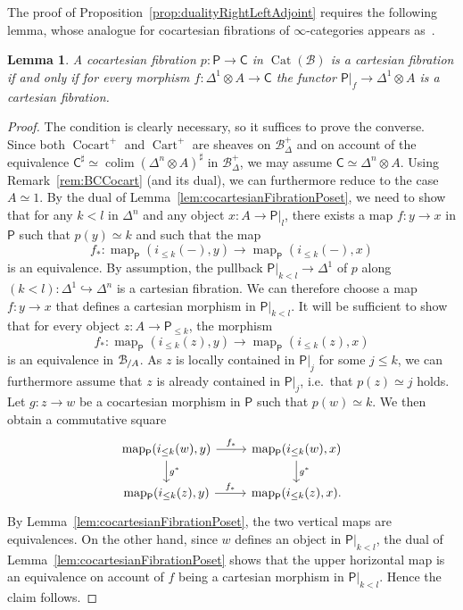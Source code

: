 \documentclass[reqno]{amsart}
\numberwithin{equation}{subsection}
\theoremstyle{plain}
\newtheorem{lemma}[equation]{Lemma}
\theoremstyle{definition}
\let\scr=\mathcal
\let\into=\hookrightarrow
\def\BB{\scr B}
\DeclareMathOperator{\Cat}{Cat}
\DeclareMathOperator{\Cart}{Cart}
\DeclareMathOperator{\Cocart}{Cocart}
\DeclareMathOperator{\Map}{map}
\newcommand{\map}[1]{\Map_{#1}}
\newcommand{\Over}[2]{#1_{\hspace{-1pt}/#2}}
\newcommand{\I}[1]{\mathsf{#1}}
\newcommand{\mSimp}[1]{#1_{\Delta}^+}
\DeclareMathOperator*{\colim}{colim}
\begin{document}
The proof of Proposition~\ref{prop:dualityRightLeftAdjoint} requires the following lemma, whose analogue for cocartesian fibrations of $\infty$-categories appears as~\cite[\href{https://kerodon.net/tag/02FP}{Proposition~02FP}]{kerodon}.
\begin{lemma}
	\label{lem:cartesianCocartesianFibrationCriterion}
	A cocartesian fibration $p\colon\I{P}\to\I{C}$ in $\Cat(\BB)$ is a cartesian fibration if and only if for every morphism $f\colon\Delta^1\otimes A\to \I{C}$ the functor $\I{P}\vert_f\to\Delta^1\otimes A$ is a cartesian fibration.
\end{lemma}
\begin{proof}
	The condition is clearly necessary, so it suffices to prove the converse. Since both $\Cocart^+$ and $\Cart^+$ are sheaves on $\mSimp\BB$ and on account of the equivalence $\I{C}^\sharp\simeq\colim (\Delta^n\otimes A)^\sharp$ in $\mSimp\BB$, we may assume $\I{C}\simeq\Delta^n\otimes A$. Using Remark~\ref{rem:BCCocart} (and its dual), we can furthermore reduce to the case $A\simeq 1$. By the dual of Lemma~\ref{lem:cocartesianFibrationPoset}, we need to show that for any $k<l$ in $\Delta^n$ and any object $x\colon A\to\I{P}\vert_l$, there exists a map $f\colon y\to x$ in $\I{P}$ such that $p(y)\simeq k$ and such that the map
	\begin{equation*}
	f_\ast\colon \map{\I{P}}(i_{\leq k}(-),y)\to\map{\I{P}}(i_{\leq k}(-),x)
	\end{equation*}
	is an equivalence. By assumption, the pullback $\I{P}\vert_{k< l}\to\Delta^1$ of $p$ along $(k< l)\colon\Delta^1\into\Delta^n$ is a cartesian fibration. We can therefore choose a map $f\colon y\to x$ that defines a cartesian morphism in $\I{P}\vert_{k<l}$. It will be sufficient to show that for every object $z\colon A\to \I{P}_{\leq k}$, the morphism
	\begin{equation*}
	f_\ast\colon \map{\I{P}}(i_{\leq k}(z),y)\to\map{\I{P}}(i_{\leq k}(z),x)
	\end{equation*}
	is an equivalence in $\Over{\BB}{A}$. As $z$ is locally contained in $\I{P}\vert_j$ for some $j\leq k$, we can furthermore assume that $z$ is already contained in $\I{P}\vert_j$, i.e.\ that $p(z)\simeq j$ holds. Let $g\colon z\to w$ be a cocartesian morphism in $\I{P}$ such that $p(w)\simeq k$. We then obtain a commutative square
	\begin{equation*}
	\begin{tikzcd}
		\map{\I{P}}(i_{\leq k}(w),y)\arrow[r, "f_\ast"]\arrow[d, "g^\ast"] & \map{\I{P}}(i_{\leq k}(w),x)\arrow[d, "g^\ast"]\\
		\map{\I{P}}(i_{\leq k}(z),y)\arrow[r, "f_\ast"] & \map{\I{P}}(i_{\leq k}(z),x).
	\end{tikzcd}
	\end{equation*}
	By Lemma~\ref{lem:cocartesianFibrationPoset}, the two vertical maps are equivalences. On the other hand, since $w$ defines an object in $\I{P}\vert_{k<l}$, the dual of Lemma~\ref{lem:cocartesianFibrationPoset} shows that the upper horizontal map is an equivalence on account of $f$ being a cartesian morphism in $\I{P}\vert_{k<l}$. Hence the claim follows. 
\end{proof}
\end{document}
